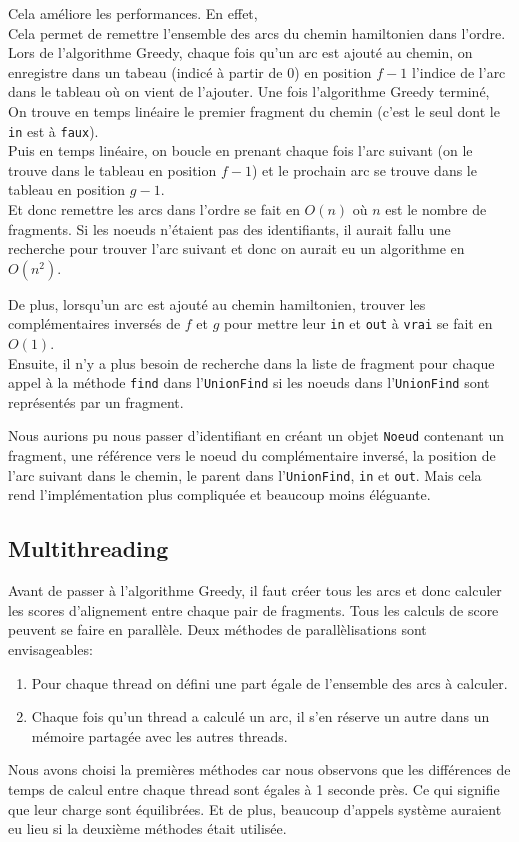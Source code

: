Cela améliore les performances. En effet,\\
Cela permet de remettre l'ensemble des arcs du chemin hamiltonien dans l'ordre.
Lors de l'algorithme Greedy, chaque fois qu'un arc  est ajouté au chemin, on enregistre dans un tabeau (indicé à partir de 0) en position $f-1$ l'indice de l'arc dans le tableau où on vient de l'ajouter.
Une fois l'algorithme Greedy terminé,\\
On trouve en temps linéaire le premier fragment du chemin (c'est le seul dont le \texttt{in} est à \texttt{faux}).\\
Puis en temps linéaire, on boucle en prenant chaque fois l'arc  suivant (on le trouve dans le tableau en position $f-1$) et le prochain arc se trouve dans le tableau en position $g-1$.\\
Et donc remettre les arcs dans l'ordre se fait en $O(n)$ où $n$ est le nombre de fragments.
Si les noeuds n'étaient pas des identifiants, il aurait fallu une recherche pour trouver l'arc suivant et donc on aurait eu un algorithme en $O\left(n^2\right)$.

De plus, lorsqu'un arc  est ajouté au chemin hamiltonien, trouver les complémentaires inversés de $f$ et $g$ pour mettre leur \texttt{in} et \texttt{out} à \texttt{vrai} se fait en $O(1)$.\\
Ensuite, il n'y a plus besoin de recherche dans la liste de fragment pour chaque appel à la méthode \texttt{find} dans l'\texttt{UnionFind} si les noeuds dans l'\texttt{UnionFind} sont représentés par un fragment.

Nous aurions pu nous passer d'identifiant en créant un objet \texttt{Noeud} contenant un fragment, une référence vers le noeud du complémentaire inversé, la position de l'arc suivant dans le chemin, le parent dans l'\texttt{UnionFind}, \texttt{in} et \texttt{out}.
Mais cela rend l'implémentation plus compliquée et beaucoup moins éléguante.

\subsection{Multithreading}
Avant de passer à l'algorithme Greedy, il faut créer tous les arcs et donc calculer les scores d'alignement entre chaque pair de fragments.
Tous les calculs de score peuvent se faire en parallèle. Deux méthodes de parallèlisations sont envisageables:
\begin{enumerate}
 \item Pour chaque thread on défini une part égale de l'ensemble des arcs à calculer.
 \item Chaque fois qu'un thread a calculé un arc, il s'en réserve un autre dans un mémoire partagée avec les autres threads.
\end{enumerate}
Nous avons choisi la premières méthodes car nous observons que les différences de temps de calcul entre chaque thread sont égales à 1 seconde près. %
Ce qui signifie que leur charge sont équilibrées.
Et de plus, beaucoup d'appels système auraient eu lieu si la deuxième méthodes était utilisée.

